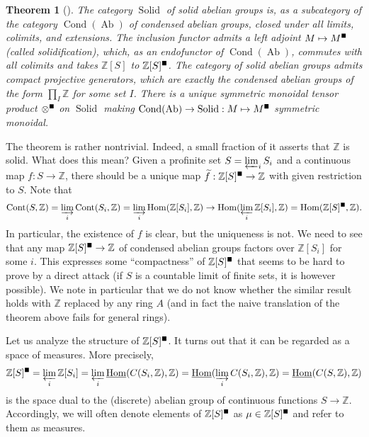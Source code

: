 \documentclass[11pt]{amsbook}
\DeclareMathOperator{\Cont}{Cont}
\DeclareMathOperator{\Hom}{Hom}
\newcommand{\intHom}{\underline{\Hom}}
\DeclareMathOperator{\Cond}{Cond}
\DeclareMathOperator{\Ab}{Ab}
\newcommand{\solid}{{\mathsmaller{\blacksquare}}}
\DeclareMathOperator{\Solid}{Solid}
\renewcommand*{\tilde}{\widetilde}
\numberwithin{equation}{section}
\newtheorem{theorem}{Theorem}
\numberwithin{theorem}{section}
\theoremstyle{definition}
\begin{document}
\begin{theorem}[{\cite[Theorem 5.8 (i), Theorem 6.2 (i)]{Condensed}}]\label{thm:solid} The category $\Solid$ of solid abelian groups is, as a subcategory of the category $\Cond(\Ab)$ of condensed abelian groups, closed under all limits, colimits, and extensions. The inclusion functor admits a left adjoint $M\mapsto M^\solid$ (called solidification), which, as an endofunctor of $\Cond(\Ab)$, commutes with all colimits and takes $\mathbb Z[S]$ to $\mathbb Z[S]^\solid$. The category of solid abelian groups admits compact projective generators, which are exactly the condensed abelian groups of the form $\prod_I \mathbb Z$ for some set $I$. There is a unique symmetric monoidal tensor product $\otimes^\solid$ on $\Solid$ making $\Cond(\Ab)\to \Solid: M\mapsto M^\solid$ symmetric monoidal.
\end{theorem}

The theorem is rather nontrivial. Indeed, a small fraction of it asserts that $\mathbb Z$ is solid. What does this mean? Given a profinite set $S=\varprojlim_i S_i$ and a continuous map $f: S\to \mathbb Z$, there should be a unique map $\tilde{f}: \mathbb Z[S]^\solid\to \mathbb Z$ with given restriction to $S$. Note that
\[
\Cont(S,\mathbb Z)=\varinjlim_i \Cont(S_i,\mathbb Z)=\varinjlim_i\Hom(\mathbb Z[S_i],\mathbb Z)\to \Hom(\varprojlim_i \mathbb Z[S_i],\mathbb Z)=\Hom(\mathbb Z[S]^\solid,\mathbb Z).
\]
In particular, the existence of $f$ is clear, but the uniqueness is not. We need to see that any map $\mathbb Z[S]^\solid\to \mathbb Z$ of condensed abelian groups factors over $\mathbb Z[S_i]$ for some $i$. This expresses some ``compactness'' of $\mathbb Z[S]^\solid$ that seems to be hard to prove by a direct attack (if $S$ is a countable limit of finite sets, it is however possible). We note in particular that we do not know whether the similar result holds with $\mathbb Z$ replaced by any ring $A$ (and in fact the naive translation of the theorem above fails for general rings).

Let us analyze the structure of $\mathbb Z[S]^\solid$. It turns out that it can be regarded as a space of measures. More precisely,
\[
\mathbb Z[S]^\solid = \varprojlim_i \mathbb Z[S_i] = \varprojlim_i \intHom(C(S_i,\mathbb Z),\mathbb Z)=\intHom(\varinjlim_i C(S_i,\mathbb Z),\mathbb Z)=\intHom(C(S,\mathbb Z),\mathbb Z)
\]
is the space dual to the (discrete) abelian group of continuous functions $S\to \mathbb Z$. Accordingly, we will often denote elements of $\mathbb Z[S]^\solid$ as $\mu\in \mathbb Z[S]^\solid$ and refer to them as measures.
\end{document}
